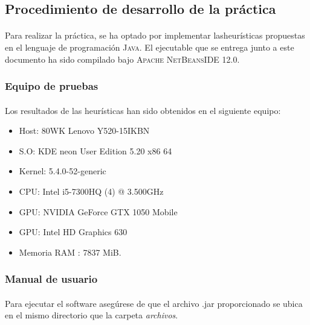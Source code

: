 \documentclass{article}
\begin{document}
	\subsection{Procedimiento de desarrollo de la práctica}
	
	\paragraph{}Para realizar la práctica, se ha optado por implementar lasheurísticas propuestas en el lenguaje de programación \textsc{Java}. El ejecutable que se entrega junto a este documento ha sido compilado bajo \textsc{ Apache NetBeansIDE 12.0}.
	
	\subsubsection{Equipo de pruebas}
	
	\paragraph{}Los resultados de las heurísticas han sido obtenidos en el siguiente equipo:
	
		\begin{itemize}
			
			\item Host: 80WK Lenovo Y520-15IKBN
			\item S.O: KDE neon User Edition 5.20 x86 64
			\item Kernel: 5.4.0-52-generic
			\item CPU: Intel i5-7300HQ (4) @ 3.500GHz
			\item GPU: NVIDIA GeForce GTX 1050 Mobile
			\item GPU: Intel HD Graphics 630
			\item Memoria RAM : 7837 MiB.
			
		\end{itemize}

	\subsubsection{Manual de usuario}
	
		\paragraph{}Para ejecutar el software asegúrese de que el archivo .jar proporcionado se ubica en el mismo directorio que la carpeta \emph{archivos}. 
		
\end{document}
